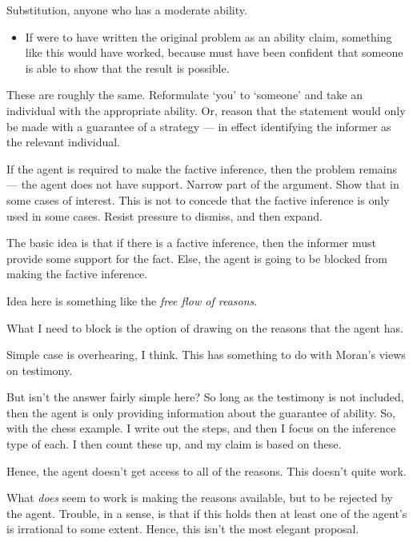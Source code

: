 \documentclass[10pt]{article}
\begin{document}
\begin{note}[Embedded]
  \begin{note}[Substitution]
    Substitution, anyone who has a moderate ability.
    \begin{itemize}
    \item If \citeauthor{Emms:2000aa} were to have written the original problem as an ability claim, something like this would have worked, because \citeauthor{Emms:2000aa} must have been confident that someone is able to show that the result is possible.
    \end{itemize}

    These are roughly the same.
    Reformulate `you' to `someone' and take an individual with the appropriate ability.
    Or, reason that the statement would only be made with a guarantee of a strategy --- in effect identifying the informer as the relevant individual.

    If the agent is required to make the factive inference, then the problem remains --- the agent does not have support.
    Narrow part of the argument.
    Show that in some cases of interest.
    This is not to concede that the factive inference is only used in some cases.
    Resist pressure to dismiss, and then expand.
  \end{note}

  \begin{note}
    The basic idea is that if there is a factive inference, then the informer must provide some support for the fact.
    Else, the agent is going to be blocked from making the factive inference.

    Idea here is something like the \emph{free flow of reasons}.

    What I need to block is the option of drawing on the reasons that the agent has.

    Simple case is overhearing, I think.
    This has something to do with Moran's views on testimony.


    But isn't the answer fairly simple here?
    So long as the testimony is not included, then the agent is only providing information about the guarantee of ability.
    So, with the chess example.
    I write out the steps, and then I focus on the inference type of each.
    I then count these up, and my claim is based on these.

    Hence, the agent doesn't get access to all of the reasons.
    This doesn't quite work.

    What \emph{does} seem to work is making the reasons available, but to be rejected by the agent.
    Trouble, in a sense, is that if this holds then at least one of the agent's is irrational to some extent.
    Hence, this isn't the most elegant proposal.


\end{note}
\end{note}
\end{document}
